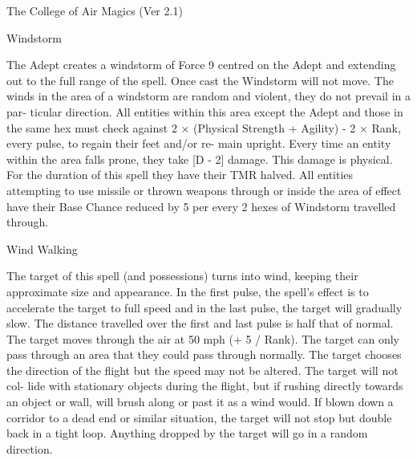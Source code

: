 \begin{Chapter}{The College of Air Magics (Ver 2.1)}
\begin{spell}[S-16]{Windstorm }
\begin{effects}
The Adept creates a windstorm of Force 9 
centred on the Adept and extending out to the full 
range  of  the  spell.  Once  cast  the  Windstorm  will 
not move. The winds in the area of a windstorm are 
random  and  violent,  they  do  not  prevail  in  a  par-
ticular direction. All entities within this area except 
the  Adept  and  those  in  the  same  hex  must  check 
against  2  ×  (Physical  Strength  +  Agility)  -  2  × 
Rank,  every  pulse,  to  regain  their  feet  and/or  re-
main upright. Every  time  an  entity  within the area 
falls prone, they take [D - 2] damage. This damage 
is physical. For the duration of this spell they have 
their  TMR  halved.  All  entities  attempting  to  use 
missile  or  thrown  weapons  through  or  inside  the 
area of effect have their Base Chance reduced by 5 
per every 2 hexes of Windstorm travelled through. 

\end{effects}
\end{spell}

\begin{spell}[S-17]{Wind Walking }

\begin{effects}
 The  target  of  this  spell  (and  possessions) 
turns into wind, keeping their approximate size and 
appearance. In the first pulse, the spell’s effect is to 
accelerate  the  target  to  full  speed  and  in  the  last 
pulse,  the  target  will  gradually  slow.  The  distance 
travelled over the first and last pulse is half that of 
normal. The target moves through the air at 50 mph 
(+  5  /  Rank).  The  target  can  only  pass  through  an 
area  that  they  could  pass  through  normally.  The 
target  chooses  the  direction  of  the  flight  but  the 
speed  may  not  be  altered.  The  target  will  not  col-
lide with stationary objects during the flight, but if 
rushing  directly  towards  an  object  or  wall,  will 
brush  along  or  past  it  as  a  wind  would.  If  blown 
down a corridor to a dead end or similar situation, 
the  target  will  not  stop  but  double  back  in  a  tight 
loop.  Anything  dropped  by  the  target  will  go  in  a 
random direction. 


\end{effects}
\end{spell}
\end{Chapter}
